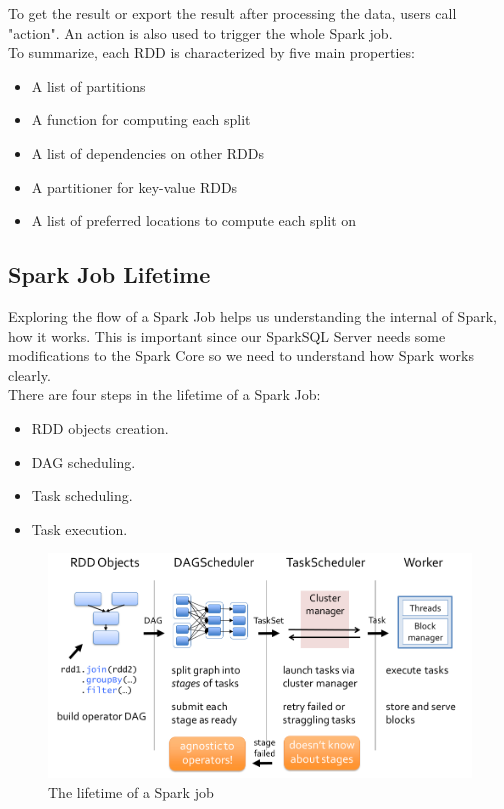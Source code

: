 To get the result or export the result after processing the data, users call "action". An action is also used to trigger the whole Spark job.\\

To summarize, each RDD is characterized by five main properties:
\begin{itemize}
\item A list of partitions
\item A function for computing each split
\item A list of dependencies on other RDDs
\item A partitioner for key-value RDDs
\item A list of preferred locations to compute each split on
\end{itemize}

\subsection{Spark Job Lifetime}
Exploring the flow of a Spark Job helps us understanding the internal of Spark, how it works. This is important since our SparkSQL Server needs some modifications to the Spark Core so we need to understand how Spark works clearly.\\
There are four steps in the lifetime of a Spark Job:
\begin{itemize}
\item RDD objects creation.
\item DAG scheduling.
\item Task scheduling.
\item Task execution.
\end{itemize}
\begin{figure}
\includegraphics[width=\textwidth]{Figures/spark-job-lifetime.jpeg}
\caption{The lifetime of a Spark job}
\label{fig:lifetime}
\end{figure}

